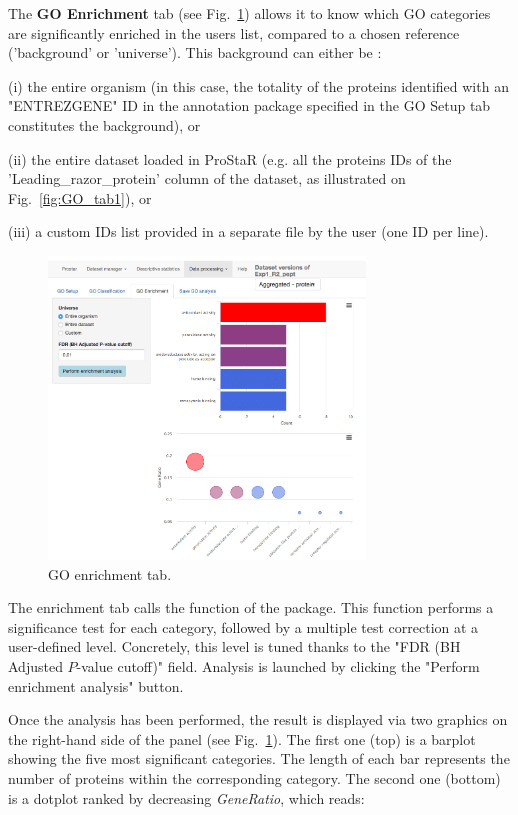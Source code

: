 \documentclass[12pt]{article}
\begin{document}
{The \textbf{GO Enrichment} tab (see Fig.~\ref{fig:GO_tab3}) allows it to know which
GO categories are significantly enriched in the users list, compared 
to a chosen reference ('background' or 'universe'). 
This background can either be : 

(i) the entire 
organism (in this case, the totality of the proteins identified with an 
"ENTREZGENE" ID in the annotation package specified in the GO Setup tab 
constitutes the background), or 

(ii) the entire dataset loaded in ProStaR (e.g. all the proteins IDs of the 
'Leading\_razor\_protein' column of the dataset, as illustrated on 
Fig.~\ref{fig:GO_tab1}), or 

(iii) a custom IDs list provided in a separate file by the user (one ID per line). 


\begin {figure}
\centering
\includegraphics[width=0.75\textwidth]{images/GO_tab3.png}
\caption{GO enrichment tab.}\label{fig:GO_tab3}
\end {figure}

The enrichment tab calls the  function of the 
 package. This function performs a significance test
for each category, followed by a multiple test correction at a user-defined level.
Concretely, this level is tuned thanks to 
the "FDR (BH Adjusted $P$-value cutoff)" field. 
Analysis is launched by clicking the "Perform enrichment analysis" button.

Once the analysis has been performed, the result is displayed via two graphics 
on the right-hand side of the panel (see Fig.~\ref{fig:GO_tab3}). 
The first one (top) is a barplot showing the five most significant categories. The 
length of each bar represents the number of proteins within the corresponding category. 
The second one (bottom) is a dotplot ranked by decreasing \textit{GeneRatio}, which reads: 


}
\end{document}
